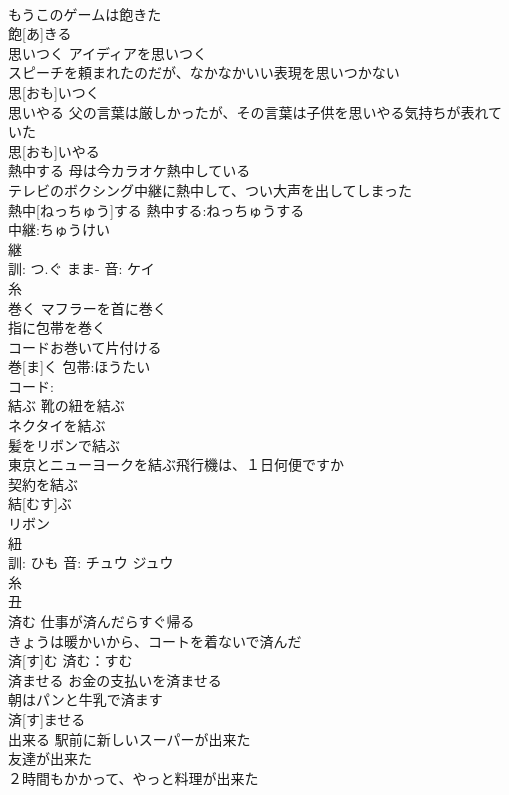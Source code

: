 \documentclass[8pt]{extreport}
\begin{document}
\begin{CJK}{UTF8}{min}
\\	もうこのゲームは飽きた 
\\	飽[あ]きる						
\\	思いつく	アイディアを思いつく 
\\	スピーチを頼まれたのだが、なかなかいい表現を思いつかない 
\\	思[おも]いつく						
\\	思いやる	父の言葉は厳しかったが、その言葉は子供を思いやる気持ちが表れていた 
\\	思[おも]いやる			
\\	熱中する	母は今カラオケ熱中している 
\\	テレビのボクシング中継に熱中して、つい大声を出してしまった 
\\	熱中[ねっちゅう]する			熱中する:ねっちゅうする
\\	中継:ちゅうけい
\\	継 
\\	訓: つ.ぐ まま- 音: ケイ 
\\	糸 
\\	巻く	マフラーを首に巻く 
\\	指に包帯を巻く 
\\	コードお巻いて片付ける 
\\	巻[ま]く			包帯:ほうたい
\\	コード:
\\	結ぶ	靴の紐を結ぶ 
\\	ネクタイを結ぶ 
\\	髪をリボンで結ぶ 
\\	東京とニューヨークを結ぶ飛行機は、１日何便ですか 
\\	契約を結ぶ 
\\	結[むす]ぶ		
\\	リボン
\\	紐 
\\	訓: ひも 音: チュウ ジュウ 
\\	糸 
\\	丑 
\\	済む	仕事が済んだらすぐ帰る 
\\	きょうは暖かいから、コートを着ないで済んだ 
\\	済[す]む			済む：すむ
\\	済ませる	お金の支払いを済ませる 
\\	朝はパンと牛乳で済ます 
\\	済[す]ませる						
\\	出来る	駅前に新しいスーパーが出来た 
\\	友達が出来た 
\\	２時間もかかって、やっと料理が出来た 

\end{CJK}
\end{document}
